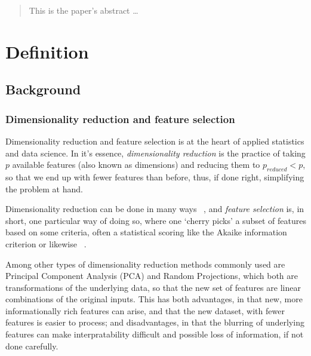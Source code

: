 \documentclass[12pt]{article}
\begin{document}
\maketitle


\begin{abstract}
This is the paper's abstract \ldots
\end{abstract}

\tableofcontents


\section{Definition}\label{definition}

\subsection{Background}

\subsubsection{Dimensionality reduction and feature selection}

Dimensionality reduction and feature selection is at the heart of applied statistics and data science. In it's essence, \emph{dimensionality reduction} is the practice of taking $p$ available features (also known as dimensions) and reducing them to $p_{reduced} < p$, so that we end up with fewer features than before, thus, if done right, simplifying the problem at hand. 

Dimensionality reduction can be done in many ways ~\cite{wiki:dimred}, and \emph{feature selection} is, in short, one particular way of doing so, where one `cherry picks' a subset of features based on some criteria, often a statistical scoring like the Akaike information criterion or likewise ~\cite{wiki:feature}.

Among other types of dimensionality reduction methods commonly used are Principal Component Analysis (PCA) and Random Projections, which both are transformations of the underlying data, so that the new set of features are linear combinations of the original inputs. This has both advantages, in that new, more informationally rich features can arise, and that the new dataset, with fewer features is easier to process; and disadvantages, in that the blurring of underlying features can make interpratability difficult and possible loss of information, if not done carefully. \\
\end{document}
